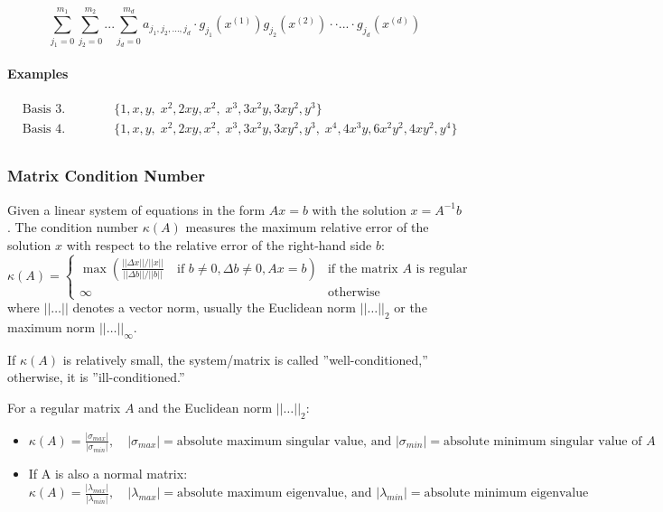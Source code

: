 \[
	\sum\limits_{j_1=0}^{m_1} \sum\limits_{j_2=0}^{m_2} ... \sum\limits_{j_d=0}^{m_d} a_{j_1,j_2,...,j_d} \cdot g_{j_1}(x^{(1)}) g_{j_2}(x^{(2)}) \cdot \cdot ... \cdot g_{j_d}(x^{(d)})
\]

\paragraph{Examples}
\begin{align*}
    &\text{Basis 3. Grad:} &&
    \{ 1,x,y, \; x^2,2xy,x^2, \; x^3,3x^2y,3xy^2,y^3 \} \\
    &\text{Basis 4. Grad:} &&
    \{ 1,x,y, \; x^2,2xy,x^2, \; x^3,3x^2y,3xy^2,y^3, \; x^4,4x^3y,6x^2y^2,4xy^2,y^4\} \\
\end{align*}

\subsubsection{Matrix Condition Number}
Given a linear system of equations in the form $Ax=b$ with the solution $x = A^{-1} b$.
The condition number $\kappa(A)$ measures the maximum relative error of the solution $x$ with respect to the relative error of the right-hand side $b$:
\[
  \kappa(A) = \begin{cases}
    \max \left(\frac{||\Delta x||/||x||}{||\Delta b|| / ||b||} \quad \text{if } b \neq 0, \Delta b \neq 0, Ax = b\right) & \text{if the matrix } A \text{ is regular}\\
    \infty & \text{otherwise}
  \end{cases}
\]
where $||\ldots||$ denotes a vector norm, usually the Euclidean norm $||\ldots||_2$ or the maximum norm $||\ldots||_\infty$.

If $\kappa (A)$ is relatively small, the system/matrix is called ''well-conditioned,'' otherwise, it is ''ill-conditioned.''

For a regular matrix $A$ and the Euclidean norm $||\dots||_2$:
\begin{itemize}
  \item $\kappa (A) = \frac{|\sigma_{max}|}{|\sigma_{min}|}, \quad |\sigma_{max}| = \text{absolute maximum singular value, and } |\sigma_{min}| = \text{absolute minimum singular value of } A$
  \item If A is also a normal matrix: $\kappa (A) = \frac{|\lambda_{max}|}{|\lambda_{min}|}, \quad |\lambda_{max}| = \text{absolute maximum eigenvalue, and } |\lambda_{min}| = \text{absolute minimum eigenvalue}$
\end{itemize}
